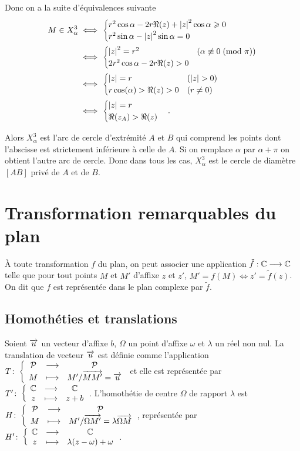 Donc on a la suite d'équivalences suivante
\begin{align}
    M \in X_{\alpha}^3 & \iff 
    \begin{cases} 
        r^2\cos \alpha - 2r\Re(z) + \left\lvert z\right\rvert^2\cos \alpha \geqslant 0 \\ 
        r^2\sin \alpha - \left\lvert z\right\rvert^2\sin \alpha  = 0
    \end{cases}\\
    & \iff 
    \begin{cases}
        \left\lvert z\right\rvert^2 = r^2 & (\alpha \not\equiv 0\!\pmod {\pi}) \\ 
        2r^2\cos \alpha - 2r \Re(z)>0&
    \end{cases}\\
    & \iff 
    \begin{cases}
        \left\lvert z\right\rvert = r & (\left\lvert z\right\rvert>0)\\ 
        r\cos(\alpha) > \Re(z)>0 & (r\neq 0)
    \end{cases}\\
    & \iff 
    \begin{cases}
        \left\lvert z\right\rvert = r \\ 
        \Re(z_A) > \Re(z)
    \end{cases}.
\end{align}

Alors \(X_{\alpha}^{3}\) est l'arc de cercle d'extrémité \(A\) et \(B\) qui 
comprend les points dont l'abscisse est strictement inférieure à celle de \(A\). 
Si on remplace \(\alpha\) par \(\alpha + \pi\) on obtient l'autre arc de cercle. 
Donc dans tous les cas, \(X_{\alpha}^3\) est le cercle de diamètre \([AB]\) 
privé de \(A\) et de \(B\).

\section{Transformation remarquables du plan}

À toute transformation \(f\) du plan, on peut associer une application 
\(\tilde{f} : \mathbb{C} \longrightarrow \mathbb{C}\) telle que pour tout points \(M\) et \(M'\) 
d'affixe \(z\) et \(z'\), \(M' = f(M) \iff z' = \tilde{f}(z)\). On dit que \(f\) 
est représentée dans le plan complexe par \(\tilde{f}\).

\subsection{Homothéties et translations}

\begin{defdef}
    Soient \(\overrightarrow{u}\) un vecteur d'affixe \(b\), \(\Omega\) un point d'affixe 
    \(\omega\) et \(\lambda\) un réel non nul. La translation de vecteur \(\overrightarrow{u}\) 
    est définie comme l'application \(T\colon \left\{\begin{array}{ccc} \mathcal{P} & \longrightarrow &\mathcal{P}\\ M & \longmapsto & M' / \overrightarrow{MM'} = 
    \overrightarrow{u} \end{array} \right.\) et elle est représentée par \(T'\colon \left\{\begin{array}{ccc} \mathbb{C} & \longrightarrow &\mathbb{C}\\ z & \longmapsto & z + b \end{array} \right.\). 
    L'homothétie de centre \(\Omega\) de rapport \(\lambda\) est 
    \(H\colon \left\{\begin{array}{ccc} \mathcal{P} & \longrightarrow &\mathcal{P}\\ M & \longmapsto & M' / \overrightarrow{\Omega M'} = \lambda \overrightarrow{\Omega 
    M} \end{array} \right.\), représentée par \(H'\colon \left\{\begin{array}{ccc} \mathbb{C} & \longrightarrow &\mathbb{C}\\ z & \longmapsto & \lambda(z - \omega) + 
    \omega \end{array} \right.\).
\end{defdef}

